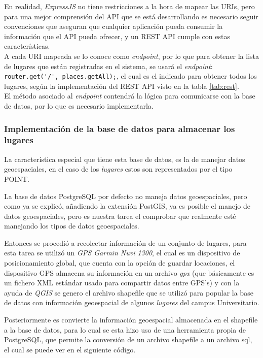En realidad, \emph{ExpressJS} no tiene restricciones a la hora de mapear las URIs, pero para una mejor comprensión del API que se está desarrollando es necesario seguir convenciones que aseguran que cualquier aplicación pueda consumir la información que el API pueda ofrecer, y un REST API cumple con estas características. \\

A cada URI mapeada se lo conoce como \emph{endpoint}, por lo que para obtener la lista de lugares que están registradas en el sistema, se usará el \emph{endpoint}: \verb|router.get('/', places.getAll);|, el cual es el indicado para obtener todos los lugares, según la implementación del REST API visto en la tabla \ref{tab:rest}. \\

El método asociado al \emph{endpoint} contendrá la lógica para comunicarse con la base de datos, por lo que es necesario implementarla. \\


\subsubsection{Implementación de la base de datos para almacenar los lugares}

La característica especial que tiene esta base de datos, es la de manejar datos geoespaciales, en el caso de los \emph{lugares} estos son representados por el tipo POINT.

La base de datos PostgreSQL por defecto no maneja datos geoespaciales, pero como ya se explicó, añadiendo la extensión PostGIS, ya es posible el manejo de datos geoespaciales, pero es nuestra tarea el comprobar que realmente esté manejando los tipos de datos geoespaciales.

Entonces se procedió a recolectar información de un conjunto de lugares, para esta tarea se utilizó un \emph{GPS Garmin Nuvi 1300}, el cual es un dispositivo de posicionamiento global, que cuenta con la opción de guardar locaciones, el dispositivo GPS almacena su información en un archivo \emph{gpx} (que básicamente es un fichero XML estándar usado para compartir datos entre GPS's) y con la ayuda de \emph{QGIS} se genero el archivo shapefile que se utilizó para popular la base de datos con información geoespacial de algunos \emph{lugares} del campus Universitario.

Posteriormente es convierte la información geoespacial almacenada en el shapefile a la base de datos, para lo cual se esta hizo uso de una herramienta propia de PostgreSQL, que permite la conversión de un archivo shapefile a un archivo sql, el cual se puede ver en el siguiente código.

